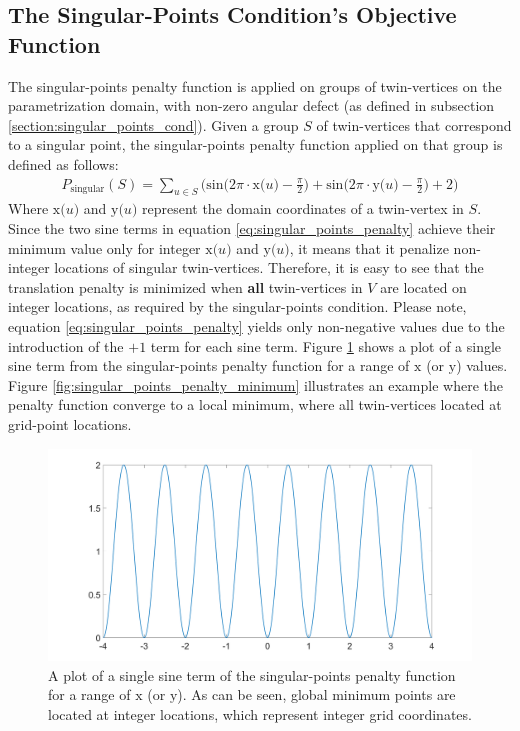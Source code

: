 \subsection{The Singular-Points Condition's Objective Function}
\label{section:singular_points_penlaty_function_method}
The singular-points penalty function is applied on groups of twin-vertices on the parametrization domain, with non-zero angular defect (as defined in subsection \ref{section:singular_points_cond}). Given a group $S$ of twin-vertices that correspond to a singular point, the singular-points penalty function applied on that group is defined as follows:
\begin{equation}\label{eq:singular_points_penalty}
\begin{split}
P_{\mathrm{singular}}\left(S\right) = \sum_{u \in S} \bigg( \mathrm{sin} \Big( 2\pi\cdot\mathrm{x}\big(u\big) - \frac{\pi}{2}\Big) + \mathrm{sin} \Big( 2\pi\cdot\mathrm{y}\big(u\big) - \frac{\pi}{2}\Big) + 2 \bigg)
\end{split}
\end{equation}
Where $\mathrm{x}\big(u\big)$ and $\mathrm{y}\big(u\big)$ represent the domain coordinates of a twin-vertex in $S$. Since the two sine terms in equation \ref{eq:singular_points_penalty} achieve their minimum value only for integer $\mathrm{x}\big(u\big)$ and $\mathrm{y}\big(u\big)$, it means that it penalize non-integer locations of singular twin-vertices. Therefore, it is easy to see that the translation penalty is minimized when \textbf{all} twin-vertices in $V$ are located on integer locations, as required by the singular-points condition. Please note, equation \ref{eq:singular_points_penalty} yields only non-negative values due to the introduction of the $+1$ term for each sine term. Figure \ref{fig:singular_points_penalty_sine_term} shows a plot of a single sine term from the singular-points penalty function for a range of $\mathrm{x}$ (or $\mathrm{y}$) values. Figure \ref{fig:singular_points_penalty_minimum} illustrates an example where the penalty function converge to a local minimum, where all twin-vertices located at grid-point locations.
\begin{figure}[ht]
\centering
\includegraphics[width=13cm]{figures/singular_points/singular_points_penalty_function_sine_term.png}
\caption[The Singular-Points Penalty Function (Single Sine Term)]{A plot of a single sine term of the singular-points penalty function for a range of $\mathrm{x}$ (or $\mathrm{y}$). As can be seen, global minimum points are located at integer locations, which represent integer grid coordinates.}
\label{fig:singular_points_penalty_sine_term}
\end{figure}
